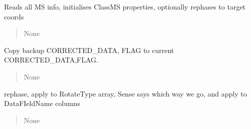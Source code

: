 \documentclass[letterpaper,10pt,english]{sphinxmanual}
\begin{document}
\begin{fulllineitems}
\begin{fulllineitems}
\label{\detokenize{api/killMS.Data:killMS.Data.ClassMS.ClassMS.ReadMSInfo}}
\pysigstartsignatures
{}
\pysigstopsignatures
\sphinxAtStartPar
Reads all MS info, initialises ClassMS properties, optionally rephases to target coords
\begin{quote}\begin{description}
\sphinxAtStartPar
None

\end{description}\end{quote}

\end{fulllineitems}


\begin{fulllineitems}
\label{\detokenize{api/killMS.Data:killMS.Data.ClassMS.ClassMS.Restore}}
\pysigstartsignatures
{}
\pysigstopsignatures
\sphinxAtStartPar
Copy backup CORRECTED\_DATA, FLAG to current CORRECTED\_DATA,FLAG.
\begin{quote}\begin{description}
\sphinxAtStartPar
None

\end{description}\end{quote}

\end{fulllineitems}


\begin{fulllineitems}
\label{\detokenize{api/killMS.Data:killMS.Data.ClassMS.ClassMS.Rotate}}
\pysigstartsignatures
{}
\pysigstopsignatures
\sphinxAtStartPar
rephase, apply to RotateType array, Sense says which way we go, and apply to DataFIeldName columns
\begin{quote}\begin{description}
\sphinxAtStartPar
None


\end{description}
\end{quote}
\end{fulllineitems}
\end{fulllineitems}
\end{document}
